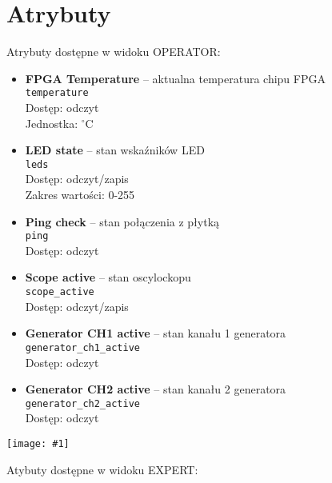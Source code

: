 \documentclass[12pt,a4paper]{article}
\newcommand{\screenshot}[1]{\begin{minipage}[c]{\textwidth}\texttt{[image: \#1]}\end{minipage}}
\begin{document}
	\section{Atrybuty}
	Atrybuty dostępne w widoku OPERATOR:
	\begin{itemize}
		\item \textbf{FPGA Temperature} -- aktualna temperatura chipu FPGA\\
			  \texttt{temperature}\\
			  Dostęp: odczyt\\
			  Jednostka: $^{\circ}$C
		\item \textbf{LED state} -- stan wskaźników LED\\
			  \texttt{leds}\\
			  Dostęp: odczyt/zapis\\
			  Zakres wartości: 0-255
		\item \textbf{Ping check} -- stan połączenia z płytką\\
			  \texttt{ping}\\
			  Dostęp: odczyt
		\item \textbf{Scope active} -- stan oscylockopu\\
			  \texttt{scope\_active}\\
			  Dostęp: odczyt/zapis
		\item \textbf{Generator CH1 active} -- stan kanału 1 generatora\\
			  \texttt{generator\_ch1\_active}\\
			  Dostęp: odczyt
		\item \textbf{Generator CH2 active} -- stan kanału 2 generatora\\
			  \texttt{generator\_ch2\_active}\\
			  Dostęp: odczyt
	\end{itemize}
	\screenshot{screenshots/operator.png}
	Atybuty dostępne w widoku EXPERT:
\end{document}
